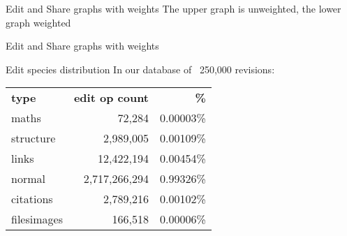 \documentclass[t]{beamer}
\begin{document}
  \begin{frame}{Edit and Share graphs with weights}
    The upper graph is unweighted, the lower graph weighted
    



\end{frame}

  \begin{frame}{Edit and Share graphs with weights}

    \begin{alertblock}{Edit species distribution}
      In our database of ~250,000 revisions:
      \begin{tabular}{l|r|r}
        \textbf{type} & \textbf{edit op count} & \textbf{\%}\\
        maths & 72,284 & 0.00003\%\\
        structure & 2,989,005 & 0.00109\%\\
        links  &   12,422,194 & 0.00454\%\\
        normal& 2,717,266,294 & 0.99326\%\\
        citations & 2,789,216 & 0.00102\%\\
        filesimages& 166,518 & 0.00006\%\\
      \end{tabular}
    \end{alertblock}


  \end{frame}
\end{document}
